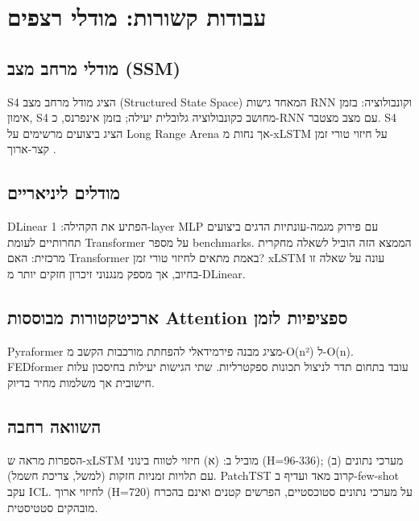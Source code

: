 
\clearpage
\chapter{עבודות קשורות: מודלי רצפים}

\section{מודלי מרחב מצב (\textenglish{SSM})}

\textenglish{S4} \cite{gu2021s4} הציג מודל מרחב מצב (\textenglish{Structured State Space}) המאחד גישות \textenglish{RNN} וקונבולוציה: בזמן אימון, \textenglish{S4} מחושב כקונבולוציה גלובלית יעילה; בזמן אינפרנס, כ-\textenglish{RNN} עם מצב מצטבר. \textenglish{S4} הציג ביצועים מרשימים על \textenglish{Long Range Arena} אך נחות מ-\textenglish{xLSTM} על חיזוי טורי זמן קצר-ארוך \cite{beck2024xlstm}.

\section{מודלים ליניאריים}

\textenglish{DLinear} \cite{zeng2023dlinear} הפתיע את הקהילה: \textenglish{1-layer MLP} עם פירוק מגמה-עונתיות הדגים ביצועים תחרותיים לעומת \textenglish{Transformer} על מספר \textenglish{benchmarks}. הממצא הזה הוביל לשאלה מחקרית מרכזית: האם \textenglish{Transformer} באמת מתאים לחיזוי טורי זמן? \textenglish{xLSTM} עונה על שאלה זו בחיוב, אך מספק מנגנוני זיכרון חזקים יותר מ-\textenglish{DLinear}.

\section{ארכיטקטורות מבוססות \textenglish{Attention} ספציפיות לזמן}

\textenglish{Pyraformer} \cite{liu2022pyraformer} מציג מבנה פירמידאלי להפחתת מורכבות הקשב מ-\textenglish{O(n²)} ל-\textenglish{O(n)}. \textenglish{FEDformer} \cite{zhou2022fedformer} עובד בתחום תדר לניצול תכונות ספקטרליות. שתי הגישות יעילות בחיסכון עלות חישובית אך משלמות מחיר בדיוק.

\section{השוואה רחבה}

הספרות מראה ש-\textenglish{xLSTM} מוביל ב: (א) חיזוי לטווח בינוני (\textenglish{H=96-336}); (ב) מערכי נתונים עם תלויות זמניות חזקות (למשל, צריכת חשמל). \textenglish{PatchTST} \cite{nie2022patchtst} קרוב מאד ועדיף ב-\textenglish{few-shot} עקב \textenglish{ICL}. לחיזוי ארוך (\textenglish{H=720}) על מערכי נתונים סטוכסטיים, הפרשים קטנים ואינם בהכרח מובהקים סטטיסטית.
